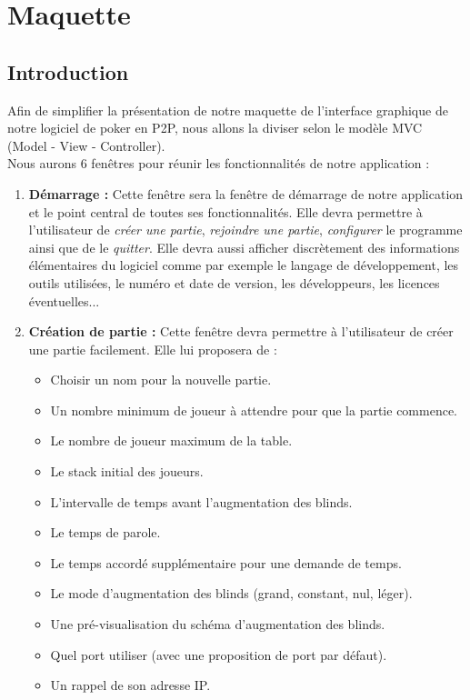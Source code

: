 \chapter{Maquette}

\section{Introduction}

Afin de simplifier la présentation de notre maquette de l'interface graphique 
de notre logiciel de poker en P2P, nous allons la diviser selon le modèle MVC 
(Model - View - Controller).\\
Nous aurons 6 fenêtres pour réunir les fonctionnalités de notre application :

\begin{enumerate}
	\item \textbf{Démarrage :} Cette fenêtre sera la fenêtre de démarrage de 
	       notre application et le point central de toutes ses fonctionnalités.
	        Elle devra permettre à l'utilisateur de \textit{créer une partie}, 
	        \textit{rejoindre une partie}, \textit{configurer} le programme 
	        ainsi que de le \textit{quitter}. Elle devra aussi afficher 
	        discrètement des informations élémentaires du logiciel comme par 
	        exemple le langage de développement, les outils utilisées, 
	        le numéro et date de version, les développeurs, 
	        les licences éventuelles... 
	
	\item \textbf{Création de partie :} Cette fenêtre devra permettre à 
	      l'utilisateur de créer une partie facilement. Elle lui proposera de :

	\begin{itemize}
		\item Choisir un nom pour la nouvelle partie.
		\item Un nombre minimum de joueur à attendre pour que la partie commence.
		\item Le nombre de joueur maximum de la table.
		\item Le stack initial des joueurs.
		\item L'intervalle de temps avant l'augmentation des blinds.
		\item Le temps de parole.
		\item Le temps accordé supplémentaire pour une demande de temps.
		\item Le mode d'augmentation des blinds (grand, constant, nul, léger).
		\item Une pré-visualisation du schéma d'augmentation des blinds.
		\item Quel port utiliser (avec une proposition de port par défaut).
		\item Un rappel de son adresse IP.
	\end{itemize}


\end{enumerate}
